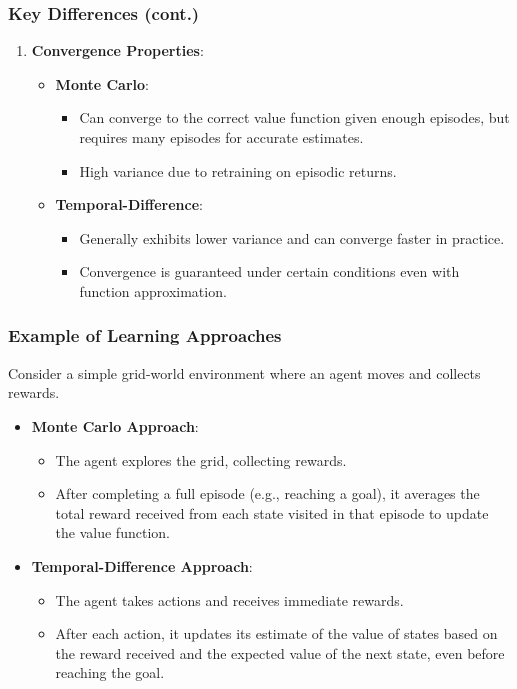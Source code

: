 \documentclass[aspectratio=169]{beamer}
\begin{document}
\begin{frame}[fragile]
  \frametitle{Key Differences (cont.)}
  \begin{enumerate}[resume]
    \item \textbf{Convergence Properties}:
      \begin{itemize}
        \item \textbf{Monte Carlo}:
          \begin{itemize}
            \item Can converge to the correct value function given enough episodes, but requires many episodes for accurate estimates.
            \item High variance due to retraining on episodic returns.
          \end{itemize}
        \item \textbf{Temporal-Difference}:
          \begin{itemize}
            \item Generally exhibits lower variance and can converge faster in practice.
            \item Convergence is guaranteed under certain conditions even with function approximation.
          \end{itemize}
      \end{itemize}
  \end{enumerate}
\end{frame}

\begin{frame}[fragile]
  \frametitle{Example of Learning Approaches}
  Consider a simple grid-world environment where an agent moves and collects rewards.
  
  \begin{itemize}
    \item \textbf{Monte Carlo Approach}:
      \begin{itemize}
        \item The agent explores the grid, collecting rewards. 
        \item After completing a full episode (e.g., reaching a goal), it averages the total reward received from each state visited in that episode to update the value function.
      \end{itemize}
  
    \item \textbf{Temporal-Difference Approach}:
      \begin{itemize}
        \item The agent takes actions and receives immediate rewards. 
        \item After each action, it updates its estimate of the value of states based on the reward received and the expected value of the next state, even before reaching the goal.
      \end{itemize}
  \end{itemize}
\end{frame}
\end{document}
